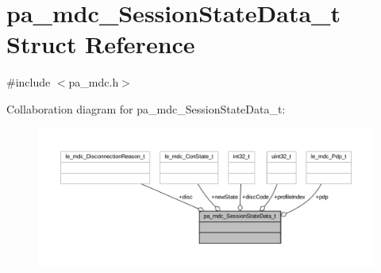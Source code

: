 \hypertarget{structpa__mdc___session_state_data__t}{}\section{pa\+\_\+mdc\+\_\+\+Session\+State\+Data\+\_\+t Struct Reference}
\label{structpa__mdc___session_state_data__t}


{\ttfamily \#include $<$pa\+\_\+mdc.\+h$>$}



Collaboration diagram for pa\+\_\+mdc\+\_\+\+Session\+State\+Data\+\_\+t\+:
\nopagebreak
\begin{figure}[H]
\begin{center}
\leavevmode
\includegraphics[width=350pt]{structpa__mdc___session_state_data__t__coll__graph}
\end{center}
\end{figure}
